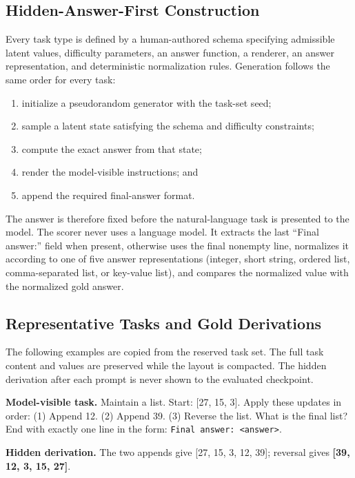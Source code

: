 \documentclass[sigconf,anonymous,review]{acmart}
\newenvironment{promptbox}[1]{%
  \begin{mdframed}[
    backgroundcolor=black!2,
    linecolor=black!65,
    linewidth=0.55pt,
    roundcorner=1.5mm,
    innerleftmargin=1.5mm,
    innerrightmargin=1.5mm,
    innertopmargin=1.2mm,
    innerbottommargin=1.2mm,
    nobreak=true,
    skipabove=4pt,
    skipbelow=5pt,
    frametitle={\strut #1},
    frametitlebackgroundcolor=black!72,
    frametitlefontcolor=white,
    frametitlefont=\bfseries\small,
    frametitlerule=true,
    frametitlerulecolor=black!72,
    frametitleaboveskip=1mm,
    frametitlebelowskip=1mm]
  \small
}{\end{mdframed}}
\begin{document}
\subsection{Hidden-Answer-First Construction}

Every task type is defined by a human-authored schema specifying admissible
latent values, difficulty parameters, an answer function, a renderer, an
answer representation, and deterministic normalization rules. Generation
follows the same order for every task:

\begin{enumerate}[leftmargin=*,itemsep=1pt]
  \item initialize a pseudorandom generator with the task-set seed;
  \item sample a latent state satisfying the schema and difficulty constraints;
  \item compute the exact answer from that state;
  \item render the model-visible instructions; and
  \item append the required final-answer format.
\end{enumerate}

The answer is therefore fixed before the natural-language task is presented to
the model. The scorer never uses a language model. It extracts the last
``Final answer:'' field when present, otherwise uses the final nonempty line,
normalizes it according to one of five answer representations (integer, short
string, ordered list, comma-separated list, or key-value list), and compares
the normalized value with the normalized gold answer.

\subsection{Representative Tasks and Gold Derivations}

The following examples are copied from the reserved task set. The full task
content and values are preserved while the layout is compacted. The hidden
derivation after each prompt is never shown to the evaluated checkpoint.

\begin{promptbox}{Working memory and updating}
\textbf{Model-visible task.} Maintain a list. Start: [27, 15, 3]. Apply these
updates in order: (1) Append 12. (2) Append 39. (3) Reverse the list. What is
the final list? End with exactly one line in the form:
\texttt{Final answer: <answer>}.

\textbf{Hidden derivation.} The two appends give
[27, 15, 3, 12, 39]; reversal gives \textbf{[39, 12, 3, 15, 27]}.
\end{promptbox}
\end{document}
